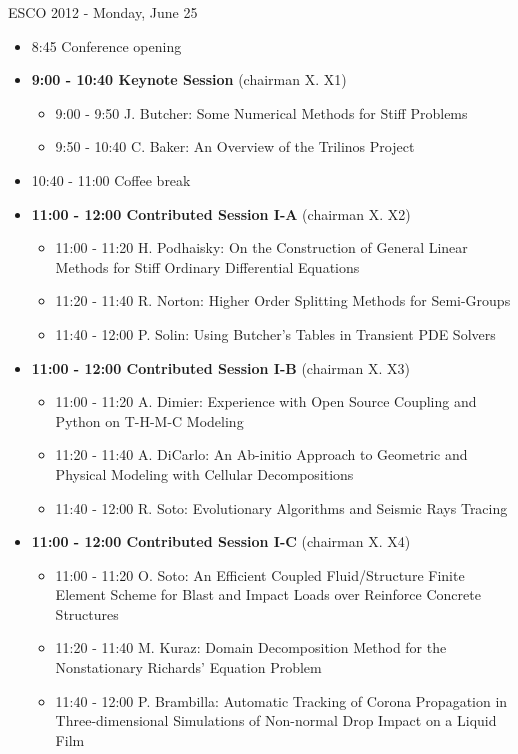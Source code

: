 \documentclass[10pt, A4]{article}%
\begin{document}
\centerline{\huge ESCO 2012 - Monday, June 25}
\vspace{4mm}

\begin{itemize}    
  \item 8:45 Conference opening
  \item {\bf 9:00 - 10:40 Keynote Session} (chairman X. X1) 
  \begin{itemize}
    \item 9:00 - 9:50 J. Butcher: Some Numerical Methods for Stiff Problems
    \item 9:50 - 10:40 C. Baker: An Overview of the Trilinos Project
  \end{itemize}
  \item 10:40 - 11:00 Coffee break
  \item {\bf 11:00 - 12:00 Contributed Session I-A} (chairman X. X2) 
  \begin{itemize}
    \item 11:00 - 11:20 H. Podhaisky: On the Construction of General Linear Methods for Stiff Ordinary Differential Equations
    \item 11:20 - 11:40 R. Norton: Higher Order Splitting Methods for Semi-Groups
    \item 11:40 - 12:00 P. Solin: Using Butcher’s Tables in Transient PDE Solvers
  \end{itemize}
  \item {\bf 11:00 - 12:00 Contributed Session I-B} (chairman X. X3) 
  \begin{itemize}
    \item 11:00 - 11:20 A. Dimier: Experience with Open Source Coupling and Python on T-H-M-C Modeling
    \item 11:20 - 11:40 A. DiCarlo: An Ab-initio Approach to Geometric and Physical Modeling with Cellular Decompositions 
    \item 11:40 - 12:00 R. Soto: Evolutionary Algorithms and Seismic Rays Tracing
  \end{itemize}
  \item {\bf 11:00 - 12:00 Contributed Session I-C} (chairman X. X4) 
  \begin{itemize}
    \item 11:00 - 11:20 O. Soto: An Efficient Coupled Fluid/Structure Finite Element Scheme for Blast and Impact Loads over Reinforce Concrete Structures
    \item 11:20 - 11:40 M. Kuraz: Domain Decomposition Method for the Nonstationary Richards’ Equation Problem  
    \item 11:40 - 12:00 P. Brambilla: Automatic Tracking of Corona Propagation in Three-dimensional Simulations of Non-normal Drop Impact on a Liquid Film 

\end{itemize}
\end{itemize}
\end{document}
